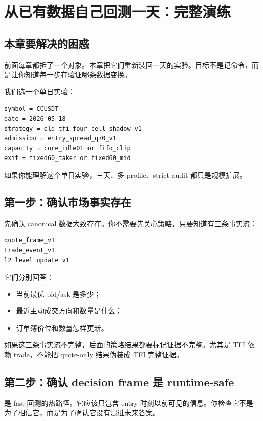 \chapter{从已有数据自己回测一天：完整演练}

\section{本章要解决的困惑}

前面每章都拆了一个对象。本章把它们重新装回一天的实验。目标不是记命令，而是让你知道每一步在验证哪条数据变换。

我们选一个单日实验：

\begin{lstlisting}
symbol = CCUSDT
date = 2026-05-18
strategy = old_tfi_four_cell_shadow_v1
admission = entry_spread_q70_v1
capacity = core_idle01 or fifo_clip
exit = fixed60_taker or fixed60_mid
\end{lstlisting}

如果你能理解这个单日实验，三天、多 profile、strict audit 都只是规模扩展。

\section{第一步：确认市场事实存在}

先确认 canonical 数据大致存在。你不需要先关心策略，只要知道有三条事实流：

\begin{lstlisting}
quote_frame_v1
trade_event_v1
l2_level_update_v1
\end{lstlisting}

它们分别回答：

\begin{itemize}[leftmargin=2em]
  \item 当前最优 bid/ask 是多少；
  \item 最近主动成交方向和数量是什么；
  \item 订单簿价位和数量怎样更新。
\end{itemize}

如果这三条事实流不完整，后面的策略结果都要标记证据不完整。尤其是 TFI 依赖 trade，不能把 quote-only 结果伪装成 TFI 完整证据。

\section{第二步：确认 decision frame 是 runtime-safe}

 是 fast 回测的热路径。它应该只包含 entry 时刻以前可见的信息。你检查它不是为了相信它，而是为了确认它没有混进未来答案。

